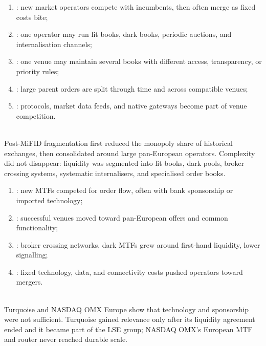 \begin{taxonomy} 
\begin{enumerate}[label=\roman*.]
\setlength{\itemsep}{0pt}
\item {}: new market operators compete with incumbents, then often merge as fixed costs bite;
\item {}: one operator may run lit books, dark books, periodic auctions, and internalisation channels;
\item {}: one venue may maintain several books with different access, transparency, or priority rules;
\item {}: large parent orders are split through time and across compatible venues;
\item {}: protocols, market data feeds, and native gateways become part of venue competition.
\end{enumerate}
\end{taxonomy}

\begin{mechanism} \\
Post-MiFID fragmentation first reduced the monopoly share of historical exchanges, then consolidated around large pan-European operators. Complexity did not disappear: liquidity was segmented into lit books, dark pools, broker crossing systems, systematic internalisers, and specialised order books.
\end{mechanism}

\begin{taxonomy} 
\begin{enumerate}[label=\roman*.]
\setlength{\itemsep}{0pt}
\item {}: new MTFs competed for order flow, often with bank sponsorship or imported technology;
\item {}: successful venues moved toward pan-European offers and common functionality;
\item {}: broker crossing networks, dark MTFs grew around first-hand liquidity, lower signalling;
\item {}: fixed technology, data, and connectivity costs pushed operators toward mergers.
\end{enumerate}
\end{taxonomy}

\begin{caveat} \\
Turquoise and NASDAQ OMX Europe show that technology and sponsorship were not sufficient. Turquoise gained relevance only after its liquidity agreement ended and it became part of the LSE group; NASDAQ OMX's European MTF and router never reached durable scale.
\end{caveat}

